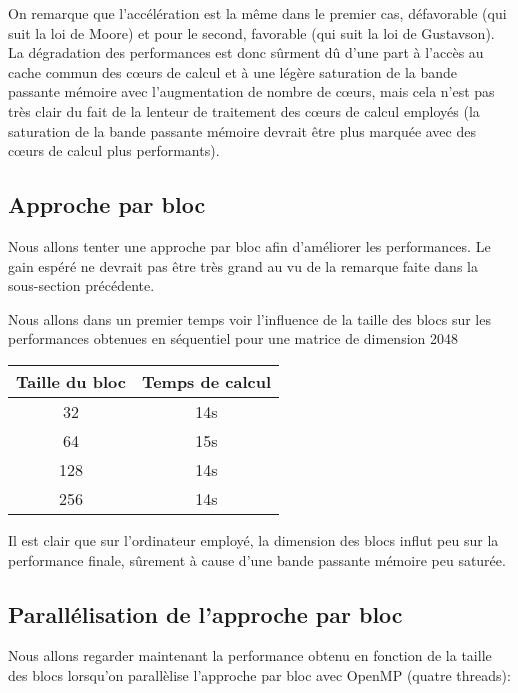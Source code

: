 \documentclass[fleqn,11pt]{article}
\begin{document}
On remarque que l'accélération est la même dans le premier cas, défavorable (qui suit la loi de Moore) et pour le second, favorable (qui suit 
la loi de Gustavson). La dégradation des performances est donc sûrment dû d'une part à l'accès au cache commun des c{\oe}urs de calcul et à 
une légère saturation de la bande passante mémoire avec l'augmentation de nombre de c{\oe}urs, mais cela n'est pas très clair du fait de la lenteur 
de traitement des c{\oe}urs de calcul employés (la saturation de la bande passante mémoire devrait être plus marquée avec des c{\oe}urs de 
calcul plus performants).

\subsection{Approche par bloc}

Nous allons tenter une approche par bloc afin d'améliorer les performances. Le gain espéré ne devrait pas être très grand au vu de la remarque faite
dans la sous-section précédente.

Nous allons dans un premier temps voir l'influence de la taille des blocs sur les performances obtenues en séquentiel pour une matrice 
de dimension 2048

\begin{tabular}{|c|c|}\hline 
    Taille du bloc & Temps de calcul  \\ \hline \hline
              32                  &      14s        \\ \hline
              64                  &      15s        \\ \hline
              128                 &      14s        \\ \hline 
              256                 &      14s        \\ \hline
\end{tabular}

Il est clair que sur l'ordinateur employé, la dimension des blocs influt peu sur la performance finale, sûrement à cause d'une bande passante
mémoire peu saturée.

\subsection{Parallélisation de l'approche par bloc}

Nous allons regarder maintenant la performance obtenu en fonction de la taille des blocs lorsqu'on parallèlise l'approche par bloc avec  
OpenMP (quatre threads):
\end{document}
